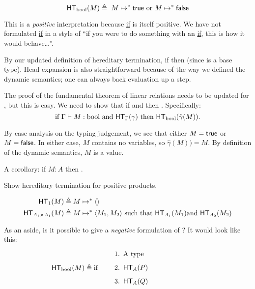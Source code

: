 \documentclass{article}
\begin{document}
\[
\hterm{\booltype}{M} \triangleq \ \steps{M}{\true} \ \text{or} \ \steps{M}{\false}
\]


This is a \textit{positive} interpretation because \underline{if} is itself positive. We have not formulated \underline{if} in a style of ``if you were to do something with an \underline{if}, this is how it would behave\ldots''.

By our updated definition of hereditary termination, if  then  (since \booltype{} is a base type). Head expansion is also straightforward because of the way we defined the dynamic semantics; one can always back evaluation up a step.

The proof of the fundamental theorem of linear relations needs to be updated for \booltype, but this is easy. We need to show that if  and \hterm{\Gamma}{\gamma} then . Specifically:
\[
\text{if} \ \hasEF{\Gamma}{M}{\booltype}  \ \text{and} \  \hterm{\Gamma}{\gamma} \ \text{then} \  \hterm{\booltype}{\hat\gamma(M)}.
\]

By case analysis on the typing judgement, we see that either $M = \mathsf{true}$ or $M = \mathsf{false}$. In either case, $M$ contains no variables, so $\hat\gamma(M)) = M$. By definition of the dynamic semantics, $M$ is a value.

A corollary: if $M : A$ then .

\begin{exercise}
Show hereditary termination for positive products.

\begin{align*}
\mathsf{HT}_{1}(M) &\triangleq M \mapsto^* \langle \rangle\\
\mathsf{HT}_{A_1 \times A_1}(M) &\triangleq M \mapsto^* \langle M_1, M_2\rangle \ \text{such that} \  \mathsf{HT}_{A_1}(M_1) \text{and} \  \mathsf{HT}_{A_2}(M_2)\\
\end{align*}
\end{exercise}

As an aside, is it possible to give a \textit{negative} formulation of \booltype? It would look like this:

\[
\hterm{\booltype}{M} \triangleq \text{if} \hspace{12pt} \begin{minipage}{5cm}
        \begin{enumerate}
        \item A type
        \item \hterm{A}{P}
        \item \hterm{A}{Q}
        \end{enumerate}
\end{minipage}\\
\]
\end{document}
